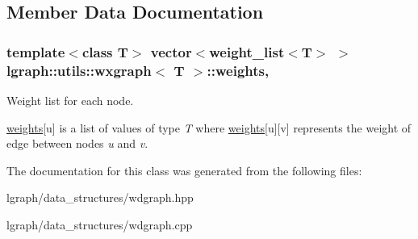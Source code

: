 \subsection{Member Data Documentation}
\hypertarget{classlgraph_1_1utils_1_1wxgraph_a15569c8c0fccb641709dc81eb0e29c94}{
\subsubsection[{weights}]{\setlength{\rightskip}{0pt plus 5cm}template$<$class T$>$ vector$<${\bf weight\-\_\-list}$<$T$>$ $>$ {\bf lgraph\-::utils\-::wxgraph}$<$ T $>$\-::weights\hspace{0.3cm}{\ttfamily [protected]}, {\ttfamily [inherited]}}}\label{classlgraph_1_1utils_1_1wxgraph_a15569c8c0fccb641709dc81eb0e29c94}


Weight list for each node. 

\hyperlink{classlgraph_1_1utils_1_1wxgraph_a15569c8c0fccb641709dc81eb0e29c94}{weights}\mbox{[}u\mbox{]} is a list of values of type {\itshape T} where \hyperlink{classlgraph_1_1utils_1_1wxgraph_a15569c8c0fccb641709dc81eb0e29c94}{weights}\mbox{[}u\mbox{]}\mbox{[}v\mbox{]} represents the weight of edge between nodes {\itshape u} and {\itshape v}. 

The documentation for this class was generated from the following files\-:\begin{DoxyCompactItemize}
\item 
lgraph/data\-\_\-structures/wdgraph.\-hpp\item 
lgraph/data\-\_\-structures/wdgraph.\-cpp\end{DoxyCompactItemize}
